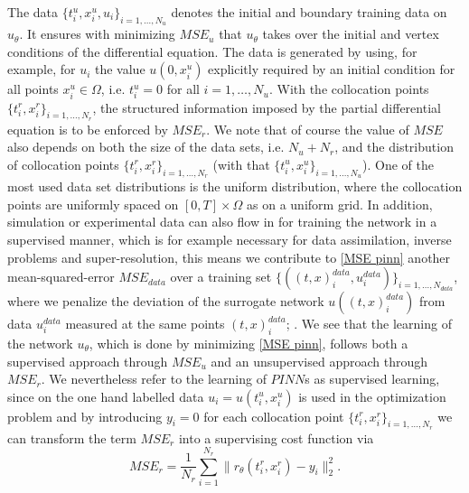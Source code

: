 The data $\{t^{u}_i, x^{u}_i, u_i \}_{i = 1, \ldots, N_u}$ denotes the initial and boundary training data on $u_\theta$. It ensures with minimizing $MSE_u$ that $u_\theta$ takes over the initial and vertex conditions of the differential equation. The data is generated by using, for example, for $u_i$ the value $u\left(0,x^{u}_i\right)$ explicitly required by an initial condition for all points $x^{u}_i \in \Omega$, i.e. $t^{u}_i = 0$ for all $i = 1, \ldots, N_u$. With the collocation points $\{t^{r}_i, x^{r}_i \}_{i = 1, \ldots, N_r}$, the structured information imposed by the partial differential equation is to be enforced by $MSE_r$. We note that of course the value of $MSE$ also depends on both the size of the data sets, i.e. $N_u + N_r$, and the distribution of collocation points $\{t^{r}_i, x^{r}_i \}_{i = 1, \ldots, N_r}$ (with that $\{t^{u}_i, x^{u}_i \}_{i = 1, \ldots, N_u}$). One of the most used data set distributions is the uniform distribution, where the collocation points are uniformly spaced on $\left[ 0, T \right] \times \Omega$ as on a uniform grid. In addition, simulation or experimental data can also flow in for training the network in a supervised manner, which is for example necessary for data assimilation, inverse problems and super-resolution, this means we contribute to \cref{MSE pinn} another mean-squared-error $MSE_{data}$ over a training set $\{\left(\left(t, x\right)^{data}_i, u^{data}_i\right) \}_{i = 1, \ldots, N_{data}}$, where we penalize the deviation of the surrogate network $u\left(\left(t, x\right)^{data}_i\right)$ from data $u^{data}_i$ measured at the same points $\left(t, x\right)^{data}_i$; \cite[p.~2]{Markidis:2021}. We see that the learning of the network $u_\theta$, which is done by minimizing \cref{MSE pinn}, follows both a supervised approach through $MSE_u$ and an unsupervised approach through $MSE_r$. We nevertheless refer to the learning of $PINN$s as supervised learning, since on the one hand labelled data $u_i = u\left(t^{u}_i, x^{u}_i\right)$ is used in the optimization problem and by introducing $y_i=0$ for each collocation point $\{t^{r}_i, x^{r}_i \}_{i = 1, \ldots, N_r}$ we can transform the term $MSE_r$ into a supervising cost function via 
\begin{equation*}
    MSE_r = \frac{1}{N_r} \sum^{N_r}_{i = 1} \lVert r_\theta \left(t^{r}_i, x^{r}_i\right) - y_i \rVert^{2}_{2}.
\end{equation*}
